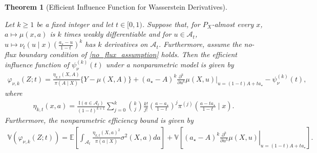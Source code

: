 \documentclass[11pt,twoside]{article}
\newtheorem{theorem}{Theorem}
\theoremstyle{definition}
\theoremstyle{remark}
\begin{document}
\begin{theorem}[Efficient Influence Function for Wasserstein Derivatives] \label{derivative_EIF}

Let $k\geq1$ be a fixed integer and let $t \in [0, 1)$. Suppose that, for $P_X$-almost every $x$, $a\mapsto\mu(x,a)$ is $k$ times weakly differentiable and for $u \in \mathcal{A}_t$, $u \mapsto \nu_t(u\mid x)(\frac{a_\star-u}{1-t})^k$ has $k$ derivatives on $\mathcal{A}_t$. Furthermore, assume the no-flux boundary condition of \cref{no_flux_assumption} holds. Then the efficient influence function of $\psi^{(k)}_\nu(t)$ under a nonparametric model is given by
\begin{align*}
       \varphi_{\nu,k}(Z;t) =  \frac{\eta_{k, t}(X, A)}{\pi(A \mid X)}\{Y-\mu(X,A)\} + (a_\star-A)^k \frac{\partial^k}{\partial u^k}\mu(X,u) \Big|_{u=(1-t)A + ta_\star} - \psi^{(k)}_\nu(t),
\end{align*}
where 
\begin{align*}
    \eta_{k,t}(x,a) = \frac{\mathbb{I}(a\in\mathcal{A}_t)}{(1-t)^{k+1}} \sum_{j=0}^{k} \binom{k}{j} \frac{k!}{j!} \left( \frac{a-a_\star}{1-t}\right)^j \pi^{(j)}\left(\frac{a-ta_\star}{1-t}\mid x\right).
\end{align*}
Furthermore, the nonparametric efficiency bound is given by
\begin{align*}
    \mathbb{V}(\varphi_{\nu,k}(Z;t)) = \mathbb{E} \! \left[ \int_{\mathcal{A}_t} \frac{\eta_{k,t}(X, a)^2}{\pi(a\mid X)} \sigma^2(X,a)da \right] + \mathbb{V} \!\left[(a_\star-A)^k \left. \frac{\partial^k}{\partial u^k}\mu(X,u) \right|_{u=(1-t)A + t a_\star} \right].
\end{align*}
    
\end{theorem}
\end{document}
